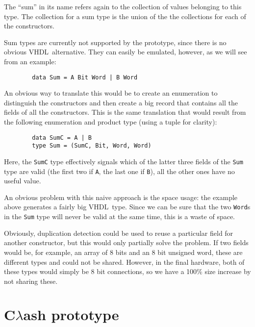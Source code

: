 \documentclass[conference]{IEEEtran}
\def\VHDL{\textsc{VHDL}}
\def\hs#1{\texttt{#1}}
\begin{document}
\begin{description}
        The ``sum'' in its name refers again to the collection of values
        belonging to this type. The collection for a sum type is the
        union of the the collections for each of the constructors.

        Sum types are currently not supported by the prototype, since there is
        no obvious \VHDL\ alternative. They can easily be emulated, however, as
        we will see from an example:

        \begin{verbatim}
        data Sum = A Bit Word | B Word
        \end{verbatim}

        An obvious way to translate this would be to create an enumeration to
        distinguish the constructors and then create a big record that
        contains all the fields of all the constructors. This is the same
        translation that would result from the following enumeration and
        product type (using a tuple for clarity):

        \begin{verbatim}
        data SumC = A | B
        type Sum = (SumC, Bit, Word, Word)
        \end{verbatim}

        Here, the \hs{SumC} type effectively signals which of the latter three
        fields of the \hs{Sum} type are valid (the first two if \hs{A}, the
        last one if \hs{B}), all the other ones have no useful value.

        An obvious problem with this naive approach is the space usage: the
        example above generates a fairly big \VHDL\ type. Since we can be
        sure that the two \hs{Word}s in the \hs{Sum} type will never be valid
        at the same time, this is a waste of space.

        Obviously, duplication detection could be used to reuse a
        particular field for another constructor, but this would only
        partially solve the problem. If two fields would be, for
        example, an array of 8 bits and an 8 bit unsigned word, these are
        different types and could not be shared. However, in the final
        hardware, both of these types would simply be 8 bit connections,
        so we have a 100\% size increase by not sharing these.
      \end{description}


\section{C$\lambda$ash prototype}
\end{document}
